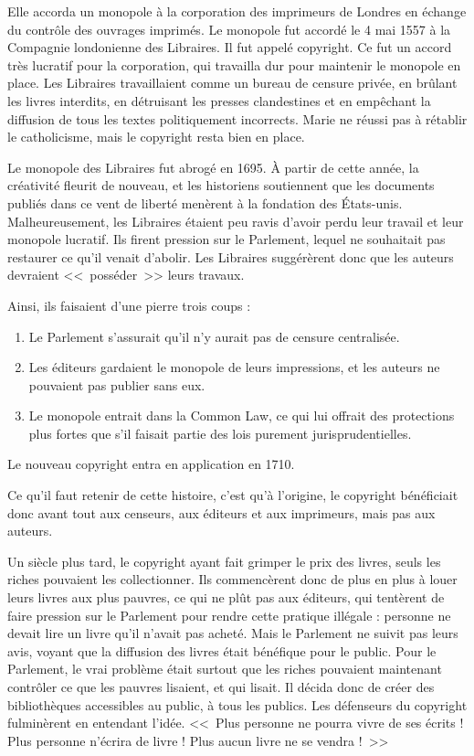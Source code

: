 Elle accorda un monopole à la corporation des imprimeurs de Londres en échange du contrôle des ouvrages imprimés.
Le monopole fut accordé le 4 mai 1557 à la Compagnie londonienne des Libraires. Il fut appelé copyright.
Ce fut un accord très lucratif pour la corporation, qui travailla dur pour maintenir le monopole en place.
Les Libraires travaillaient comme un bureau de censure privée, en brûlant les livres interdits, en détruisant les presses clandestines et en empêchant la diffusion de tous les textes politiquement incorrects.
Marie ne réussi pas à rétablir le catholicisme, mais le copyright resta bien en place.

Le monopole des Libraires fut abrogé en 1695.
À partir de cette année, la créativité fleurit de nouveau, et les historiens soutiennent que les documents publiés dans ce vent de liberté menèrent à la fondation des États-unis.
Malheureusement, les Libraires étaient peu ravis d'avoir perdu leur travail et leur monopole lucratif.
Ils firent pression sur le Parlement, lequel ne souhaitait pas restaurer ce qu'il venait d'abolir.
Les Libraires suggérèrent donc que les auteurs devraient <<~posséder~>> leurs travaux.

Ainsi, ils faisaient d'une pierre trois coups :

\begin{enumerate}
\item Le Parlement s'assurait qu'il n'y aurait pas de censure centralisée.
\item Les éditeurs gardaient le monopole de leurs impressions, et les auteurs ne pouvaient pas publier sans eux.
\item Le monopole entrait dans la Common Law, ce qui lui offrait des protections plus fortes que s'il faisait partie des lois purement jurisprudentielles.
\end{enumerate}\bigskip

Le nouveau copyright entra en application en 1710.

Ce qu'il faut retenir de cette histoire, c'est qu'à l'origine, le copyright bénéficiait donc avant tout aux censeurs, aux éditeurs et aux imprimeurs, mais pas aux auteurs.

Un siècle plus tard, le copyright ayant fait grimper le prix des livres, seuls les riches pouvaient les collectionner.
Ils commencèrent donc de plus en plus à louer leurs livres aux plus pauvres, ce qui ne plût pas aux éditeurs, qui tentèrent de faire pression sur le Parlement pour rendre cette pratique illégale : personne ne devait lire un livre qu'il n'avait pas acheté.
Mais le Parlement ne suivit pas leurs avis, voyant que la diffusion des livres était bénéfique pour le public.
Pour le Parlement, le vrai problème était surtout que les riches pouvaient maintenant contrôler ce que les pauvres lisaient, et qui lisait.
Il décida donc de créer des bibliothèques accessibles au public, à tous les publics.
Les défenseurs du copyright fulminèrent en entendant l'idée.
<<~Plus personne ne pourra vivre de ses écrits ! Plus personne n'écrira de livre ! Plus aucun livre ne se vendra !~>>

